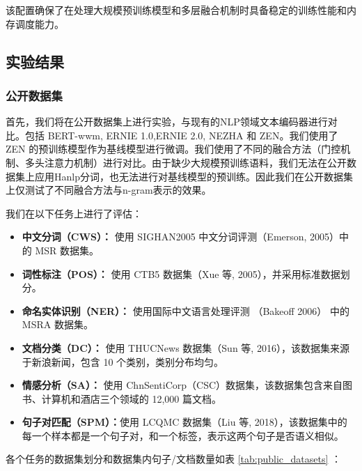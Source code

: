 \documentclass[12pt, a4paper]{ctexart}
\begin{document}
该配置确保了在处理大规模预训练模型和多层融合机制时具备稳定的训练性能和内存调度能力。

\subsection{实验结果}
\subsubsection{公开数据集}
首先，我们将在公开数据集上进行实验，与现有的NLP领域文本编码器进行对比。包括 BERT-wwm\cite{Cui_2021}, ERNIE 1.0\cite{sun2019ernieenhancedrepresentationknowledge},ERNIE 2.0\cite{sun2019ernie20continualpretraining}, NEZHA\cite{wei2021nezhaneuralcontextualizedrepresentation} 和 ZEN\cite{diao-etal-2020-zen}。我们使用了 ZEN 的预训练模型作为基线模型进行微调。我们使用了不同的融合方法（门控机制、多头注意力机制）进行对比。由于缺少大规模预训练语料，我们无法在公开数据集上应用Hanlp分词，也无法进行对基线模型的预训练。因此我们在公开数据集上仅测试了不同融合方法与n-gram表示的效果。

我们在以下任务上进行了评估：
\begin{itemize}
    \item \textbf{中文分词（CWS）：} 使用 SIGHAN2005 中文分词评测（Emerson, 2005）\cite{emerson-2005-second}中的 MSR 数据集。
    \item \textbf{词性标注（POS）：} 使用 CTB5 数据集（Xue 等, 2005）\cite{10.1017/S135132490400364X}，并采用标准数据划分。
    \item \textbf{命名实体识别（NER）：} 使用国际中文语言处理评测 （Bakeoff 2006）\cite{levow-2006-third} 中的 MSRA 数据集。
    \item \textbf{文档分类（DC）：} 使用 THUCNews 数据集（Sun 等, 2016）\cite{sun2016thuctc}，该数据集来源于新浪新闻，包含 10 个类别，类别分布均匀。
    \item \textbf{情感分析（SA）：} 使用 ChnSentiCorp（CSC）数据集\cite{yfwt-wr77-20}，该数据集包含来自图书、计算机和酒店三个领域的 12,000 篇文档。
    \item \textbf{句子对匹配（SPM）：}使用 LCQMC 数据集（Liu 等, 2018）\cite{liu-etal-2018-lcqmc}，该数据集中的每一个样本都是一个句子对，和一个标签，表示这两个句子是否语义相似。
\end{itemize}

各个任务的数据集划分和数据集内句子/文档数量如表 \ref{tab:public_datasets} ：
\end{document}
